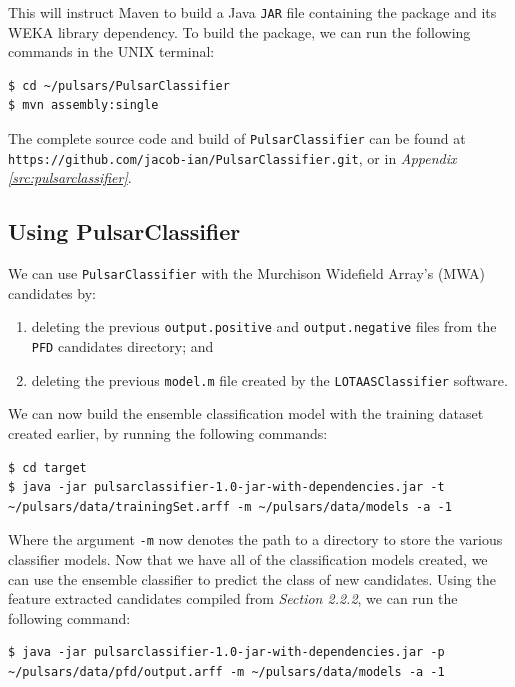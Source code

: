 \documentclass{article}
\begin{document}
\begin{appendices}
\begin{subappendices}
This will instruct Maven to build a Java \verb|JAR| file containing the package and its WEKA library dependency. To build the package, we can run the following commands in the UNIX terminal:

\begin{lstlisting}[numbers=none]
$ cd ~/pulsars/PulsarClassifier
$ mvn assembly:single
\end{lstlisting}

The complete source code and build of \verb|PulsarClassifier| can be found at \verb|https://github.com/jacob-ian/PulsarClassifier.git|, or in \emph{Appendix \ref{src:pulsarclassifier}}.

\subsection{Using PulsarClassifier}
\label{apndx:usepulsarclassifier}

We can use \verb|PulsarClassifier| with the Murchison Widefield Array's (MWA) candidates by:
\begin{enumerate}[label=\roman*.] 
    \item deleting the previous \verb|output.positive| and \verb|output.negative| files from the \verb|PFD| candidates directory; and
    \item deleting the previous \verb|model.m| file created by the \verb|LOTAASClassifier| software.
\end{enumerate}

We can now build the ensemble classification model with the training dataset created earlier, by running the following commands:

\begin{lstlisting}[numbers=none]
$ cd target
$ java -jar pulsarclassifier-1.0-jar-with-dependencies.jar -t ~/pulsars/data/trainingSet.arff -m ~/pulsars/data/models -a -1
\end{lstlisting}

Where the argument \verb|-m| now denotes the path to a directory to store the various classifier models. Now that we have all of the classification models created, we can use the ensemble classifier to predict the class of new candidates. Using the feature extracted candidates compiled from \emph{Section 2.2.2}, we can run the following command:

\begin{lstlisting}[numbers=none]
$ java -jar pulsarclassifier-1.0-jar-with-dependencies.jar -p ~/pulsars/data/pfd/output.arff -m ~/pulsars/data/models -a -1
\end{lstlisting}


\end{subappendices}
\end{appendices}
\end{document}
